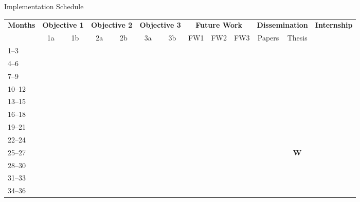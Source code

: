 \documentclass[aspectratio=169]{beamer}
\newcommand{\cmark}{\checkmark}
\newcommand{\wmark}{\textbf{W}} %
\begin{document}
\begin{frame}{Implementation Schedule}
\centering
\scriptsize
\setlength{\tabcolsep}{7pt}
\begin{tabularx}{\textwidth}{@{}l*{12}{c}@{}}
\toprule
\textbf{Months} &
\multicolumn{2}{c}{\textbf{Objective 1}} &
\multicolumn{2}{c}{\textbf{Objective 2}} &
\multicolumn{2}{c}{\textbf{Objective 3}} &
\multicolumn{3}{c}{\textbf{Future Work}} &
\multicolumn{2}{c}{\textbf{Dissemination}} &
\multicolumn{1}{c}{\textbf{Internship}} \\
\cmidrule(lr){2-3}\cmidrule(lr){4-5}\cmidrule(lr){6-7}\cmidrule(lr){8-10}\cmidrule(lr){11-12}\cmidrule(lr){13-13}
& 1a & 1b & 2a & 2b & 3a & 3b & FW1 & FW2 & FW3 & Papers & Thesis & \\ 
\midrule
\rowcolor{completed}  1--3  & \cmark &        & \cmark &        &        &        &        &        &        &        &        &        \\
\rowcolor{completed}  4--6  & \cmark & \cmark & \cmark & \cmark &        &        &        &        &        &        &        &        \\
\rowcolor{completed}  7--9  &        & \cmark &        & \cmark &        &        &        &        &        &        &        &        \\
\rowcolor{completed} 10--12 &        & \cmark &        & \cmark & \cmark &        &        &        &        &        &        &        \\
\rowcolor{completed} 13--15 &        & \cmark &        & \cmark & \cmark &        &        &        &        & \cmark &        &        \\
\rowcolor{completed} 16--18 &        & \cmark &        & \cmark & \cmark &        &        &        &        & \cmark &        &        \\
\midrule
19--21 &        &        &        &        &        &        & \cmark &        &        &        &        &        \\
22--24 &        &        &        &        &        & \cmark & \cmark & \cmark &        &        &        &        \\
25--27 &        &        &        &        &        & \cmark &        & \cmark & \cmark & \cmark & \rowcolor{writing}\wmark &        \\
28--30 &        &        &        &        &        &        &        & \cmark & \cmark &        & \rowcolor{writing}\cmark &        \\
31--33 &        &        &        &        &        &        &        &        & \cmark & \cmark & \rowcolor{writing}\cmark & \cmark \\
34--36 &        &        &        &        &        &        &        &        &        &        & \rowcolor{writing}\cmark & \cmark \\
\bottomrule
\end{tabularx}


\end{frame}
\end{document}
